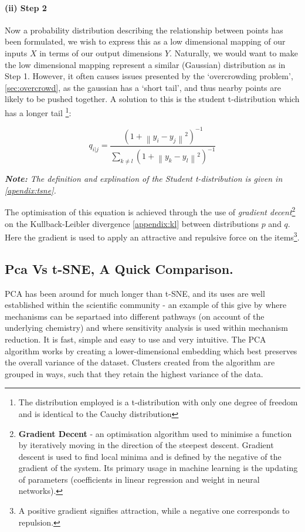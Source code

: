 \paragraph{(ii) Step 2}
Now a probability distribution describing the relationship between points has been formulated, we wish to express this as a low dimensional mapping of our inputs $X$ in terms of our output dimensions $Y$. Naturally, we would want to make the low dimensional mapping represent a similar (Gaussian) distribution as in Step 1. However, it often causes issues presented by the `overcrowding problem', \autoref{sec:overcrowd}, as the gaussian has a `short tail', and thus nearby points are likely to be pushed together. A solution to this is the student t-distribution which has a longer tail \footnote{The distribution employed is a t-distribution with only one degree of freedom and is identical to the Cauchy distribution}:

\begin{equation}
q_{i|j} =\frac{(1 + \left \| y_i - y_j \right \|^2 )^{-1}}{\sum_{k \neq l} (1 + \left \| y_k - y_l \right \|^2 )^{-1} }
\end{equation}

\emph{\textbf{Note:} The definition and explination of the Student t-distribution is given in \autoref{apendix:tsne}.
}

The optimisation of this equation is achieved through the use of \emph{gradient decent}\footnote{\textbf{Gradient Decent} - an optimisation algorithm used to minimise a function by iteratively moving in the direction of the steepest descent. Gradient descent is used to find local minima and is defined by the negative of the gradient of the system. Its primary usage in machine learning is the updating of parameters (coefficients in linear regression and weight in neural networks).}
 on the Kullback-Leibler divergence \autoref{appendix:kl} between distributions $p$ and $q$. Here the gradient is used to apply an attractive and repulsive force on the items\footnote{A positive gradient signifies attraction, while a negative one corresponds to repulsion.}.




\subsection{Pca Vs t-SNE, A Quick Comparison.}

PCA has been around for much longer than t-SNE, and its uses are well established within the scientific community - an example of this give by \cite{wyche} where mechanisms can be separtaed into different pathways (on account of the underlying chemistry) and \cite{kinetics} where sensitivity analysis is used within mechanism reduction. It is fast, simple and easy to use and very intuitive. The PCA algorithm works by creating a lower-dimensional embedding which best preserves the overall variance of the dataset. Clusters created from the algorithm are grouped in ways, such that they retain the highest variance of the data.

